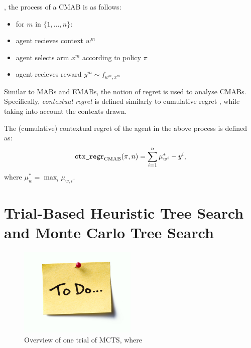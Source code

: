         , the process of a CMAB is as follows:
        \begin{itemize}
            \item for $m$ in $\{1,...,n\}$:
            \item agent recieves context $w^m$
            \item agent selects arm $x^m$ according to policy $\pi$
            \item agent recieves reward $y^m \sim f_{w^m,x^m}$
        \end{itemize}

        Similar to MABs and EMABs, the notion of regret is used to analyse CMABs. Specifically, \textit{contextual regret} is defined similarly to cumulative regret , while taking into account the contexts drawn.

        \begin{defn}
            The \textnormal{(cumulative) contextual regret} of the agent in the above process is defined as:
            \begin{align}
                {\textnormal{\texttt{ctx\_regr}}}_{{\textnormal{CMAB}}}(\pi,n) = \sum_{i=1}^n \mu_{w^i}^* - y^i,
            \end{align}
            where $\mu_{w}^* = \max_i \mu_{w,i}$.
        \end{defn}



        














\section{Trial-Based Heuristic Tree Search and Monte Carlo Tree Search}
\label{sec:2-4-thts}

    \begin{figure}
        \centering\includegraphics[width=0.5\textwidth]{figures/todo.jpg} 
        \caption[Overview of one trial of MCTS.]{Overview of one trial of MCTS, where }
        \label{fig:mcts}
    \end{figure}

